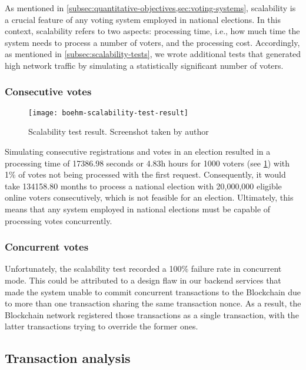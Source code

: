 As mentioned in \cref{subsec:quantitative-objectives,sec:voting-systems}, scalability is a crucial feature of any voting system employed in national elections.
In this context, scalability refers to two aspects: processing time, i.e., how much time the system needs to process a number of voters, and the processing cost.
Accordingly, as mentioned in \cref{subsec:scalability-tests}, we wrote additional tests that generated high network traffic by simulating a statistically significant number of voters.

\subsubsection{Consecutive votes}\label{subsubsec:res-consecutive-votes}

\begin{figure}[h]
    \centering
    \texttt{[image: boehm-scalability-test-result]}
    \caption[Scalability test result]{Scalability test result. Screenshot taken by author}
    \label{fig:scalability-test-result}
\end{figure}

Simulating consecutive registrations and votes in an election resulted in a processing time of 17386.98 seconds or 4.83h hours for 1000 voters (see \cref{fig:scalability-test-result}) with 1\% of votes not being processed with the first request.
Consequently, it would take 134158.80 months to process a national election with 20,000,000 eligible online voters consecutively, which is not feasible for an election.
Ultimately, this means that any system employed in national elections must be capable of processing votes concurrently.

\subsubsection{Concurrent votes}\label{subsubsec:res-concurrent-votes}

Unfortunately, the scalability test recorded a 100\% failure rate in concurrent mode.
This could be attributed to a design flaw in our backend services that made the system unable to commit concurrent transactions to the \gls{Blockchain} due to more than one transaction sharing the same transaction nonce.
As a result, the \gls{Blockchain} network registered those transactions as a single transaction, with the latter transactions trying to override the former ones.

\subsection{Transaction analysis}\label{subsec:res-transaction-analysis}

